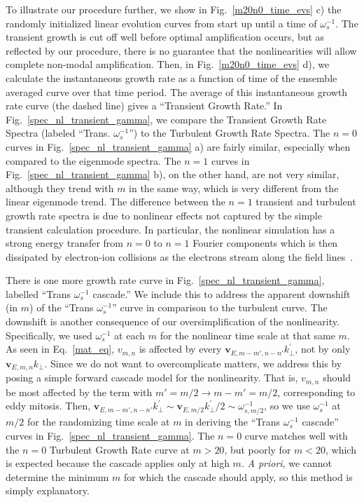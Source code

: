 \documentclass[letter,scriptaddress,twocolumn, prl,showkeys]{revtex4}
\begin{document}
To illustrate our procedure further, we show in Fig.~\ref{m20n0_time_evs} c) the randomly initialized linear evolution curves from start up until a time of $\omega_s^{-1}$. 
The transient growth is cut off well before optimal amplification occurs, but as reflected by our procedure, there is no guarantee that the nonlinearities will allow complete non-modal amplification.
Then, in Fig.~\ref{m20n0_time_evs} d), we calculate the instantaneous growth rate as a function of time of the ensemble averaged curve over that time period.
The average of this instantaneous growth rate curve (the dashed line) gives a ``Transient Growth Rate.''
In Fig.~\ref{spec_nl_transient_gamma}, we compare the Transient Growth Rate Spectra (labeled ``Trans. $\omega_s^{-1}$'') to the Turbulent Growth Rate Spectra.
The $n=0$ curves in Fig.~\ref{spec_nl_transient_gamma} a) are fairly similar, especially when compared to the eigenmode spectra.
The $n=1$ curves in Fig.~\ref{spec_nl_transient_gamma} b), on the other hand, are not very similar, although they trend with $m$ in the same way, which is very different from the linear eigenmode trend.
The difference between the $n=1$ transient and turbulent growth rate spectra is due to nonlinear effects not captured by the simple transient calculation procedure. In particular, the nonlinear
simulation has a strong energy transfer from $n=0$ to $n=1$ Fourier components which is then dissipated by electron-ion collisions as the electrons stream along the field lines~\cite{friedman2012b}. 

There is one more growth rate curve in Fig.~\ref{spec_nl_transient_gamma}, labelled ``Trans $\omega_s^{-1}$ cascade.'' We include this to address the apparent downshift (in $m$) of
the ``Trans $\omega_s^{-1}$'' curve in comparison to the turbulent curve. The downshift is another consequence of our oversimplification of the nonlinearity. Specifically, we
used $\omega_s^{-1}$ at each $m$ for the nonlinear time scale at that same $m$. As seen in Eq.~\ref{mat_eq}, $v_{m,n}$ is affected by every $\mathbf{v}_{E,m-m',n-n'} k^{'}_\perp$, not by only
$\mathbf{v}_{E,m,n} k_\perp$. Since we do not want to overcomplicate matters, we address this by posing a simple forward cascade model for the nonlinearity. That is, $v_{m,n}$ should be
most affected by the term with $m' = m/2 \rightarrow m-m' = m/2$, corresponding to eddy mitosis. Then, $\mathbf{v}_{E,m-m',n-n'} k^{'}_\perp \sim \mathbf{v}_{E,m/2} k^{'}_\perp/2 \sim \omega_{s,m/2}^{-1}$, 
so we use $\omega_s^{-1}$ at $m/2$ for the randomizing time scale at $m$ in deriving the ``Trans $\omega_s^{-1}$ cascade'' curves in Fig.~\ref{spec_nl_transient_gamma}. 
The $n=0$ curve matches well with the $n=0$ Turbulent Growth Rate curve at $m>20$, but poorly for $m<20$, which is expected because the cascade applies only at high $m$. \emph{A priori}, we
cannot determine the minimum $m$ for which the cascade should apply, so this method is simply explanatory.
\end{document}
